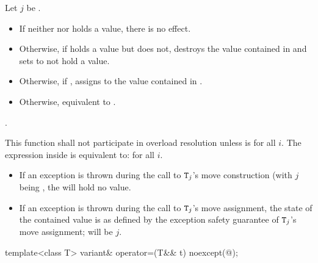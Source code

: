 \begin{itemdescr}
\pnum
Let $j$ be .

\pnum
\effects
\begin{itemize}
\item
If neither  nor  holds a value, there is no effect.
\item
Otherwise, if  holds a value but  does not, destroys the value
contained in  and sets  to not hold a value.
\item
Otherwise, if , assigns  to
the value contained in .
\item
Otherwise, equivalent to .
\end{itemize}

\pnum
\returns {}.

\pnum
\remarks
This function shall not participate in overload resolution unless
 is
 for all $i$.
The expression inside  is equivalent to:
 for all $i$.
\begin{itemize}
\item If an exception is thrown during the call to $\texttt{T}_j$'s move construction
(with $j$ being , the  will hold no value.
\item If an exception is thrown during the call to $\texttt{T}_j$'s move assignment,
the state of the contained value is as defined by the exception safety
guarantee of $\texttt{T}_j$'s move assignment;  will be $j$.
\end{itemize}
\end{itemdescr}

%
\begin{itemdecl}
template<class T> variant& operator=(T&& t) noexcept(@\seebelow@);
\end{itemdecl}

